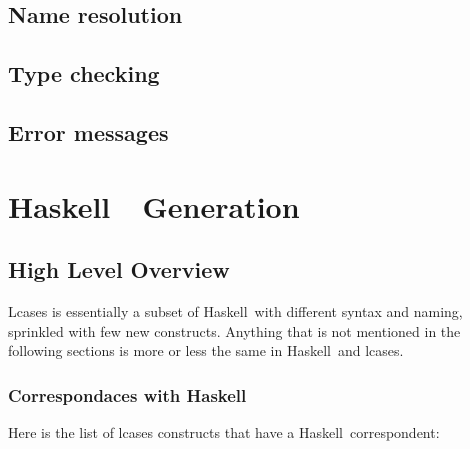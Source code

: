 \documentclass{article}
\def\H{Haskell}
\begin{document}
\subsection{Name resolution}

\subsection{Type checking}

\subsection{Error messages}

\section{\H\ \ Generation}

\subsection{High Level Overview}

Lcases is essentially a subset of \H\ with different syntax and naming,
sprinkled with few new constructs. Anything that is not mentioned in the
following sections is more or less the same in \H\ and lcases. 

\subsubsection{Correspondaces with \H}

Here is the list of lcases constructs that have a \H\ correspondent:
\end{document}
